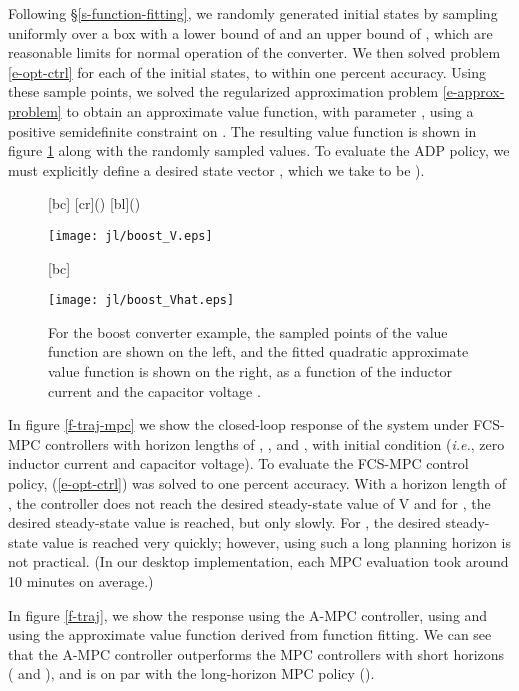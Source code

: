\documentclass[12pt]{article}
\newcommand{\ie}{{\it i.e.}}
\newif\ifarxiv
\begin{document}
Following \S\ref{s-function-fitting},
we randomly generated  initial states
by sampling uniformly over a box with
a lower bound of 
and an upper bound of ,
which are reasonable limits for normal operation of the converter.
We then solved problem \eqref{e-opt-ctrl} for each of the initial states,
to within one percent accuracy.
Using these sample points,
we solved the regularized approximation problem 
\eqref{e-approx-problem}
to obtain an approximate value function,
with parameter , using a positive semidefinite constraint on .
The resulting value function is shown in figure \ref{f-V}
along with the  randomly sampled values.
To evaluate the ADP policy, we must explicitly define a desired state vector ,
which we take to be ).


\begin{figure}
\centering
{}[bc]{\small }
[cr]{\small  ()}
[bl]{\small  ()}
\ifarxiv
\texttt{[image: boost\_V.eps]}
\else
\texttt{[image: jl/boost\_V.eps]}
\fi
\qquad\qquad
{}[bc]{\small }
\ifarxiv
\texttt{[image: boost\_Vhat.eps]}
\else
\texttt{[image: jl/boost\_Vhat.eps]}
\fi
\caption{
For the boost converter example,
the  sampled points of the value function are shown on the left,
and the fitted quadratic approximate value function 
is shown on the right,
as a function of the inductor current 
and the capacitor voltage .
}
\label{f-V}
\end{figure}

In figure \ref{f-traj-mpc} we show the closed-loop response of the system
under FCS-MPC controllers with horizon lengths of , , and ,
with initial condition  
(\ie, zero inductor current and capacitor voltage).
To evaluate the FCS-MPC control policy,
(\ref{e-opt-ctrl}) was solved to one percent accuracy.
With a horizon length of ,
the controller does not reach the desired steady-state
value of  V
and for , the desired steady-state value is reached,
but only slowly.
For , the desired steady-state value is reached very quickly;
however, using such a long planning horizon is not practical.
(In our desktop implementation, 
each MPC evaluation took around 10 minutes on average.)

In figure \ref{f-traj},
we show the response using
the A-MPC controller, using  and using the
approximate value function derived from function fitting.
We can see that the A-MPC controller outperforms the
MPC controllers with short horizons ( and ),
and is on par with the long-horizon MPC policy ().
\end{document}
